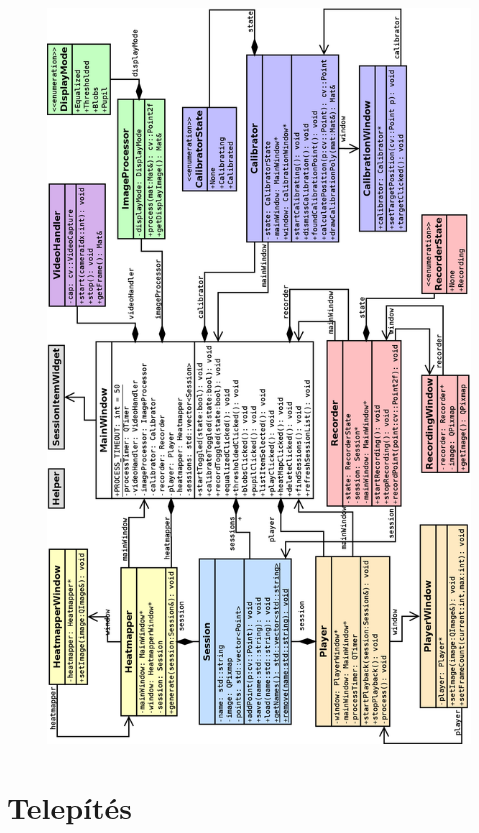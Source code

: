 \begin{figure}[!ht]
\centering
\includegraphics[width=130mm, keepaspectratio]{figures/class_diagram_aa.png}
\end{figure}


\newpage
\section{Telepítés}\label{sect:telepites}

